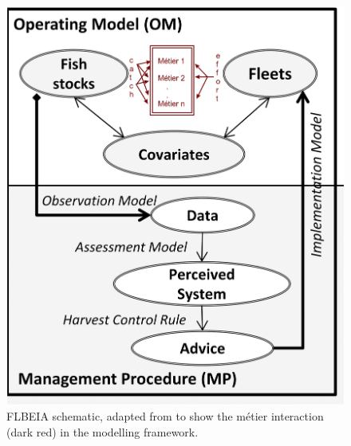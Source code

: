 \documentclass[12pt, halfline, a4paper]{ouparticle}
\begin{document}
\clearpage

\begin{figure}[!ht]
	\centering
	\includegraphics[width=0.6\linewidth]{figures/FLBEIA}
	\caption{FLBEIA schematic, adapted from \cite{Garcia2017} to show the
		métier interaction (dark red) in the modelling framework.} 
	\label{fig:flbeia}
\end{figure}	
\end{document}
